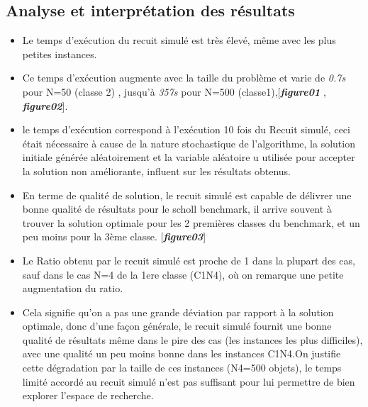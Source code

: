 \documentclass[12pt]{article}
\begin{document}
\subsection{Analyse et interprétation des résultats}
\begin{itemize}
    \item Le temps d’exécution du recuit simulé est très élevé, même avec les plus petites instances. 
    \item Ce temps d’exécution augmente avec la taille du problème et varie de \emph{0.7s} pour N=50 (classe 2) , jusqu’à \emph{357s} pour N=500 (classe1),[\textbf{\emph{figure01}} , \textbf{\emph{figure02}}].
    \item le temps d’exécution correspond à l’exécution 10 fois du Recuit simulé, ceci était nécessaire à cause de la nature stochastique de l’algorithme,  la solution initiale générée aléatoirement et la variable aléatoire u utilisée pour accepter la solution non améliorante, influent sur les résultats obtenus.
    \item En terme de qualité de solution, le recuit simulé est capable de délivrer une bonne qualité de résultats pour le scholl benchmark, il arrive souvent à trouver la solution optimale pour les 2 premières classes du benchmark, et un peu moins pour la 3ème classe. [\textbf{\emph{figure03}}]
    \item Le Ratio obtenu par le recuit simulé est proche de 1 dans la plupart des cas, sauf dans le cas N=4 de la 1ere classe (C1N4), où on remarque une petite augmentation du ratio. 
    \item Cela signifie qu’on a pas une grande déviation par rapport à la solution optimale, donc d’une façon générale, le recuit simulé fournit une bonne qualité de résultats même dans le pire des cas (les instances les plus difficiles), avec une qualité un peu moins bonne dans les instances C1N4.On justifie cette dégradation par la taille de ces instances (N4=500 objets), le temps limité accordé au recuit simulé n’est pas suffisant pour lui permettre de bien explorer l’espace de recherche. 

\end{itemize}
\end{document}
